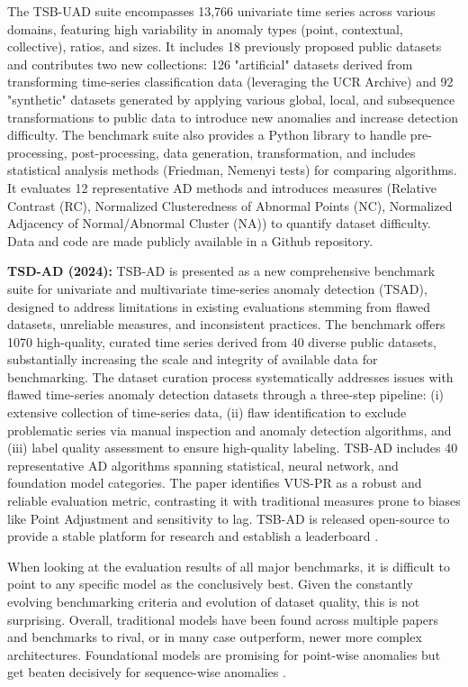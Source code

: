 \documentclass[12pt,oneside]{article}
\begin{document}
The TSB-UAD suite encompasses 13,766 univariate time series across various domains, featuring high variability in anomaly types (point, contextual, collective), ratios, and sizes. It includes 18 previously proposed public datasets and contributes two new collections: 126 "artificial" datasets derived from transforming time-series classification data (leveraging the UCR Archive) and 92 "synthetic" datasets generated by applying various global, local, and subsequence transformations to public data to introduce new anomalies and increase detection difficulty. The benchmark suite also provides a Python library to handle pre-processing, post-processing, data generation, transformation, and includes statistical analysis methods (Friedman, Nemenyi tests) for comparing algorithms. It evaluates 12 representative AD methods and introduces measures (Relative Contrast (RC), Normalized Clusteredness of Abnormal Points (NC), Normalized Adjacency of Normal/Abnormal Cluster (NA)) to quantify dataset difficulty. Data and code are made publicly available in a Github repository. \par
\textbf{TSD-AD (2024):} TSB-AD is presented as a new comprehensive benchmark suite for univariate and multivariate time-series anomaly detection (TSAD), designed to address limitations in existing evaluations stemming from flawed datasets, unreliable measures, and inconsistent practices. The benchmark offers 1070 high-quality, curated time series derived from 40 diverse public datasets, substantially increasing the scale and integrity of available data for benchmarking. The dataset curation process systematically addresses issues with flawed time-series anomaly detection datasets through a three-step pipeline: (i) extensive collection of time-series data, (ii) flaw identification to exclude problematic series via manual inspection and anomaly detection algorithms, and (iii) label quality assessment to ensure high-quality labeling. TSB-AD includes 40 representative AD algorithms spanning statistical, neural network, and foundation model categories. The paper identifies VUS-PR as a robust and reliable evaluation metric, contrasting it with traditional measures prone to biases like Point Adjustment and sensitivity to lag. 
TSB-AD is released open-source to provide a stable platform for research and establish a leaderboard \parencites{liu2024elephant}.

When looking at the evaluation results of all major benchmarks, it is difficult to point to any specific model as the conclusively best. Given the constantly evolving benchmarking criteria and evolution of dataset quality, this is not surprising. Overall, traditional models have been found across multiple papers and benchmarks to rival, or in many case outperform, newer more complex architectures. Foundational models are promising for point-wise anomalies but get beaten decisively for sequence-wise anomalies \parencites[pp.~9-10]{liu2024elephant}[p.~1706]{paparrizos2022tsb}.
\end{document}
